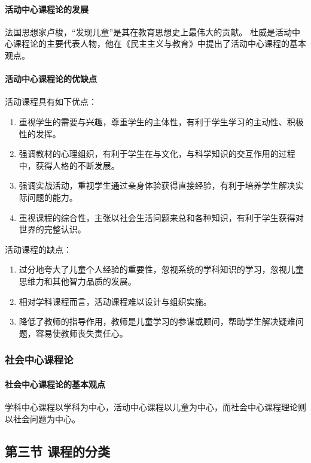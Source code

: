 \documentclass[b5paper,11pt]{article}
\begin{document}
\paragraph{活动中心课程论的发展} 法国思想家卢梭，\textcolor{ctp-red}{“发现儿童”}是其在教育思想史上最伟大的贡献。
\textcolor{ctp-red}{杜威}是活动中心课程论的主要代表人物，他在《民主主义与教育》中提出了活动中心课程的基本观点。

\paragraph{活动中心课程论的优缺点}

\textcolor{ctp-red}{活动课程具有如下优点：}
\begin{enumerate}
  \item 重视学生的需要与兴趣，尊重学生的主体性，有利于学生学习的主动性、积极性的发挥。
  \item 强调教材的心理组织，有利于学生在与文化，与科学知识的交互作用的过程中，获得人格的不断发展。
  \item 强调实战活动，重视学生通过亲身体验获得直接经验，有利于培养学生解决实际问题的能力。
  \item 重视课程的综合性，主张以社会生活问题来总和各种知识，有利于学生获得对世界的完整认识。
\end{enumerate}

\textcolor{ctp-red}{活动课程的缺点：}
\begin{enumerate}
  \item 过分地夸大了儿童个人经验的重要性，忽视系统的学科知识的学习，忽视儿童思维力和其他智力品质的发展。
  \item 相对学科课程而言，活动课程难以设计与组织实施。
  \item 降低了教师的指导作用，教师是儿童学习的参谋或顾问，帮助学生解决疑难问题，容易使教师丧失责任心。
\end{enumerate}

\subsubsection{社会中心课程论}
\paragraph{社会中心课程论的基本观点} 学科中心课程以学科为中心，活动中心课程以儿童为中心，而\textcolor{ctp-red}{社会中心课程理论}则以社会问题为中心。

\subsection{第三节 课程的分类}
\end{document}

